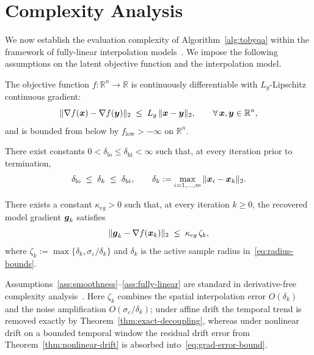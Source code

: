 \section{Complexity Analysis}
\label{sec:complexity}

We now establish the evaluation complexity of Algorithm~\ref{alg:tobyqa} within the framework of fully-linear interpolation models~\cite{ConnScheinbergVicente2009,ChenMenickellyScheinberg2018,CartisRoberts2019}. We impose the following assumptions on the latent objective function and the interpolation model.

\begin{assumption}
\label{ass:smoothness}
The objective function $f: \mathbb{R}^n \to \mathbb{R}$ is continuously differentiable with $L_g$-Lipschitz continuous gradient:
\begin{equation*}
  \|\nabla f(\boldsymbol{x}) - \nabla f(\boldsymbol{y})\|_2 \;\le\; L_g\,\|\boldsymbol{x} - \boldsymbol{y}\|_2, \qquad \forall\, \boldsymbol{x}, \boldsymbol{y} \in \mathbb{R}^n,
\end{equation*}
and is bounded from below by $f_{\mathrm{low}} > -\infty$ on $\mathbb{R}^n$.
\end{assumption}

\begin{assumption}
\label{ass:radius-bounds}
There exist constants $0<\delta_{\mathrm{lo}}\le\delta_{\mathrm{hi}}<\infty$ such that, at every iteration prior to termination,
\begin{equation}\label{eq:radius-bounds}
  \delta_{\mathrm{lo}}\;\le\;\delta_k\;\le\;\delta_{\mathrm{hi}},
  \qquad
  \delta_k:=\max_{i=1,\dots,m}\|\boldsymbol{x}_i-\boldsymbol{x}_k\|_2.
\end{equation}
\end{assumption}

\begin{assumption}
\label{ass:fully-linear}
There exists a constant $\kappa_{eg} > 0$ such that, at every iteration $k \ge 0$, the recovered model gradient $\boldsymbol{g}_k$ satisfies
\begin{equation}\label{eq:grad-error-bound}
  \|\boldsymbol{g}_k - \nabla f(\boldsymbol{x}_k)\|_2 \;\le\; \kappa_{eg}\,\zeta_k,
\end{equation}
where $\zeta_k := \max\{\delta_k, \sigma_\varepsilon / \delta_k\}$ and $\delta_k$ is the active sample radius in~\eqref{eq:radius-bounds}.
\end{assumption}

Assumptions~\ref{ass:smoothness}--\ref{ass:fully-linear} are standard in derivative-free complexity analysis~\cite{ConnScheinbergVicente2009,CartisRoberts2019}. Here $\zeta_k$ combines the spatial interpolation error $O(\delta_k)$ and the noise amplification $O(\sigma_\varepsilon / \delta_k)$; under affine drift the temporal trend is removed exactly by Theorem~\ref{thm:exact-decoupling}, whereas under nonlinear drift on a bounded temporal window the residual drift error from Theorem~\ref{thm:nonlinear-drift} is absorbed into~\eqref{eq:grad-error-bound}.

